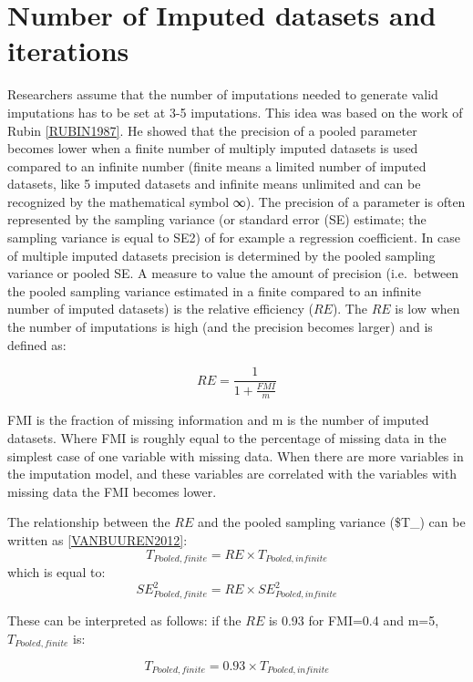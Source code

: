 \documentclass[]{book}
\begin{document}
\section{Number of Imputed datasets and
iterations}\label{number-of-imputed-datasets-and-iterations}

Researchers assume that the number of imputations needed to generate
valid imputations has to be set at 3-5 imputations. This idea was based
on the work of Rubin \ref{RUBIN1987}. He showed that the precision of a
pooled parameter becomes lower when a finite number of multiply imputed
datasets is used compared to an infinite number (finite means a limited
number of imputed datasets, like 5 imputed datasets and infinite means
unlimited and can be recognized by the mathematical symbol ∞). The
precision of a parameter is often represented by the sampling variance
(or standard error (SE) estimate; the sampling variance is equal to SE2)
of for example a regression coefficient. In case of multiple imputed
datasets precision is determined by the pooled sampling variance or
pooled SE. A measure to value the amount of precision (i.e.~between the
pooled sampling variance estimated in a finite compared to an infinite
number of imputed datasets) is the relative efficiency (\(RE\)). The
\(RE\) is low when the number of imputations is high (and the precision
becomes larger) and is defined as:

\[RE=  \frac{1}{1+ \frac{FMI}{m}}\]

FMI is the fraction of missing information and m is the number of
imputed datasets. Where FMI is roughly equal to the percentage of
missing data in the simplest case of one variable with missing data.
When there are more variables in the imputation model, and these
variables are correlated with the variables with missing data the FMI
becomes lower.

The relationship between the \(RE\) and the pooled sampling variance
(\$T\_) can be written as \ref{VANBUUREN2012}:
\[T_{Pooled,finite}=RE×T_{Pooled,infinite}\] which is equal to:
\[SE_{Pooled,finite}^2=RE×SE_{Pooled,infinite}^2 \]

These can be interpreted as follows: if the \(RE\) is 0.93 for FMI=0.4
and m=5, \(T_{Pooled,finite}\) is:

\[T_{Pooled,finite}=0.93×T_{Pooled,infinite}\]
\end{document}
